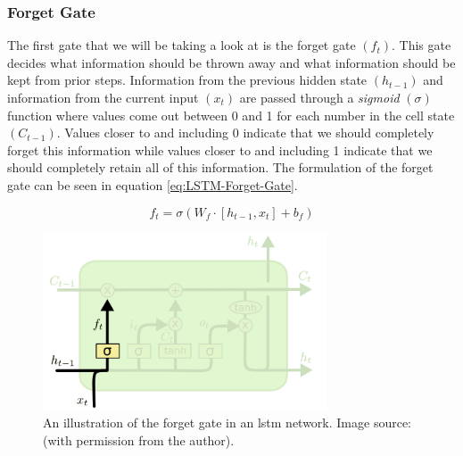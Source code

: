 \subsubsection{Forget Gate}
\label{subsubsec:Background-Information:Long-Short-Term-Memory-Networks:Forget-Gate}
The first gate that we will be taking a look at is the forget gate $(f_t)$. This gate decides what information should be thrown away and what information should be kept from prior steps. Information from the previous hidden state $(h_{t-1})$ and information from the current input $(x_t)$ are passed through a \textit{sigmoid} $(\sigma)$ function where values come out between 0 and 1 for each number in the cell state $(C_{t-1})$. Values closer to and including 0 indicate that we should completely forget this information while values closer to and including 1 indicate that we should completely retain all of this information. The formulation of the forget gate can be seen in equation \ref{eq:LSTM-Forget-Gate}.

\begin{equation}
    f_t = \sigma (W_f \cdot \left[h_{t-1}, x_t\right] + b_f)
\label{eq:LSTM-Forget-Gate}
\end{equation}

\begin{figure}[hbt!]
    \centering
    \includegraphics[width=0.75\textwidth]{Images/Chapter 3/LSTM/LSTM-Forget-Gate-Illustration.png}
    \caption{An illustration of the forget gate in an \gls{lstm} network. Image source: \cite{Colah}  (with permission from the author).}
    \label{fig:LSTM-Forget-Gate-Illustration}
\end{figure}

